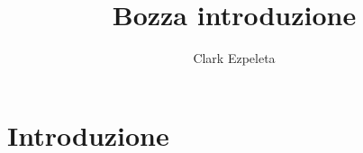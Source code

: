 \documentclass[a4paper,12pt,titlepage,oneside]{book}
\title{Bozza introduzione}
\author{Clark Ezpeleta}
\begin{document}
\maketitle
\newpage
\chapter*{Introduzione}


\end{document}
